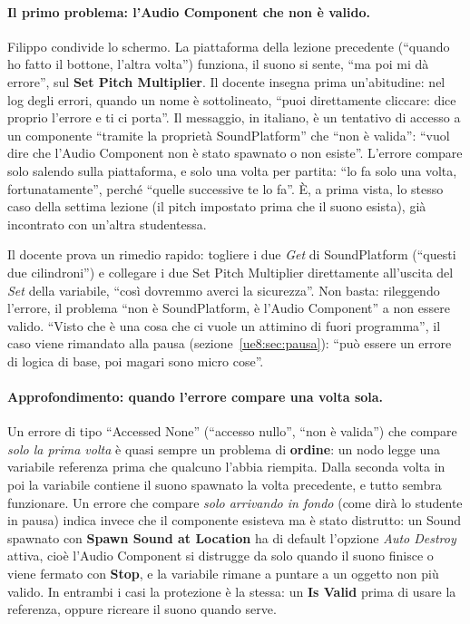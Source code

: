 \paragraph{Il primo problema: l'Audio Component che non è valido.} Filippo condivide lo
schermo. La piattaforma della lezione precedente (``quando ho fatto il bottone, l'altra
volta'') funziona, il suono si sente, ``ma poi mi dà errore'', sul \textbf{Set Pitch
Multiplier}. Il docente insegna prima un'abitudine: nel log degli errori, quando un nome
è sottolineato, ``puoi direttamente cliccare: dice proprio l'errore e ti ci porta''. Il
messaggio, in italiano, è un tentativo di accesso a un componente ``tramite la proprietà
SoundPlatform'' che ``non è valida'': ``vuol dire che l'Audio Component non è stato
spawnato o non esiste''. L'errore compare solo salendo sulla piattaforma, e solo una
volta per partita: ``lo fa solo una volta, fortunatamente'', perché ``quelle successive te
lo fa''. È, a prima vista, lo stesso caso della settima lezione (il pitch impostato prima
che il suono esista), già incontrato con un'altra studentessa.

Il docente prova un rimedio rapido: togliere i due \emph{Get} di SoundPlatform (``questi
due cilindroni'') e collegare i due Set Pitch Multiplier direttamente all'uscita del
\emph{Set} della variabile, ``così dovremmo averci la sicurezza''. Non basta: rileggendo
l'errore, il problema ``non è SoundPlatform, è l'Audio Component'' a non essere valido.
``Visto che è una cosa che ci vuole un attimino di fuori programma'', il caso viene
rimandato alla pausa (sezione~\ref{ue8:sec:pausa}): ``può essere un errore di logica di
base, poi magari sono micro cose''.

\paragraph{Approfondimento: quando l'errore compare una volta sola.} Un errore di tipo
``Accessed None'' (``accesso nullo'', ``non è valida'') che compare \emph{solo la prima
volta} è quasi sempre un problema di \textbf{ordine}: un nodo legge una variabile
referenza prima che qualcuno l'abbia riempita. Dalla seconda volta in poi la variabile
contiene il suono spawnato la volta precedente, e tutto sembra funzionare. Un errore che
compare \emph{solo arrivando in fondo} (come dirà lo studente in pausa) indica invece che
il componente esisteva ma è stato distrutto: un Sound spawnato con \textbf{Spawn Sound at
Location} ha di default l'opzione \emph{Auto Destroy} attiva, cioè l'Audio Component si
distrugge da solo quando il suono finisce o viene fermato con \textbf{Stop}, e la
variabile rimane a puntare a un oggetto non più valido. In entrambi i casi la protezione
è la stessa: un \textbf{Is Valid} prima di usare la referenza, oppure ricreare il suono
quando serve.

